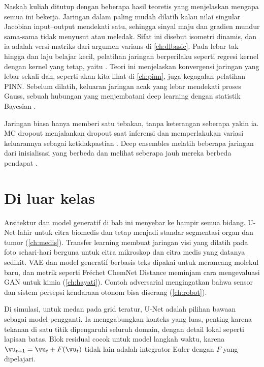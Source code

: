 Naskah kuliah ditutup dengan beberapa hasil teoretis yang menjelaskan mengapa semua ini bekerja.
Jaringan dalam paling mudah dilatih kalau nilai singular Jacobian input--output mendekati satu,
sehingga sinyal maju dan gradien mundur sama-sama tidak menyusut atau meledak. Sifat ini disebut
isometri dinamis, dan ia adalah versi matriks dari argumen varians di \cref{ch:dlbasic}. Pada
lebar tak hingga dan laju belajar kecil, pelatihan jaringan berperilaku seperti regresi kernel
dengan kernel yang tetap, yaitu  \citep{jacot2018}. Teori ini
menjelaskan konvergensi jaringan yang lebar sekali dan, seperti akan kita lihat di \cref{ch:pinn},
juga kegagalan pelatihan PINN. Sebelum dilatih, keluaran jaringan acak yang lebar mendekati
proses Gauss, sebuah hubungan yang menjembatani deep learning dengan statistik Bayesian
\citep{rasmussen2006}.

Jaringan biasa hanya memberi satu tebakan, tanpa keterangan seberapa yakin ia. MC dropout
menjalankan dropout saat inferensi dan memperlakukan variasi keluarannya sebagai ketidakpastian
\citep{gal2016}. Deep ensembles melatih beberapa jaringan dari inisialisasi yang berbeda dan melihat
seberapa jauh mereka berbeda pendapat \citep{lakshminarayanan2017}.

\section{Di luar kelas}

Arsitektur dan model generatif di bab ini menyebar ke hampir semua bidang. U-Net lahir untuk citra
biomedis dan tetap menjadi standar segmentasi organ dan tumor (\cref{ch:medis}). Transfer learning
membuat jaringan visi yang dilatih pada foto sehari-hari berguna untuk citra mikroskop dan citra medis
yang datanya sedikit. VAE dan model generatif berbasis teks dipakai untuk merancang molekul baru, dan
metrik seperti Fréchet ChemNet Distance meminjam cara mengevaluasi GAN untuk kimia (\cref{ch:hayati}).
Contoh adversarial mengingatkan bahwa sensor dan sistem persepsi kendaraan otonom bisa diserang
(\cref{ch:robot}).

Di simulasi, untuk medan pada grid teratur, U-Net adalah pilihan bawaan sebagai model pengganti. Ia
menggabungkan konteks yang luas, penting karena tekanan di satu titik dipengaruhi seluruh domain,
dengan detail lokal seperti lapisan batas. Blok residual cocok untuk model langkah waktu, karena
$\vu_{t+1}=\vu_t+F(\vu_t)$ tidak lain adalah integrator Euler dengan $F$ yang dipelajari.

